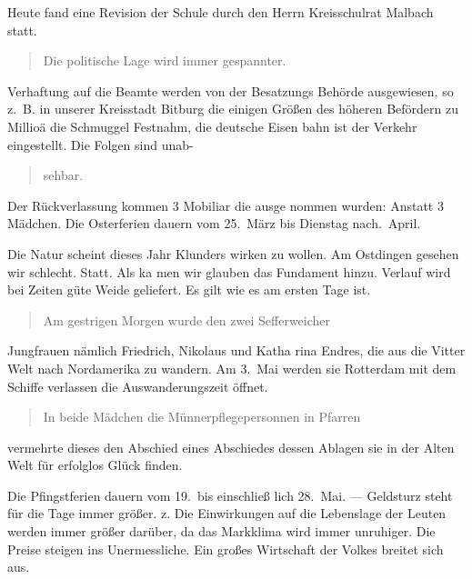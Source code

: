 

%
Heute fand eine Revision der Schule durch den Herrn\ob
Kreisschulrat Malbach statt.

\pend
\begin{verse}
Die politische Lage wird immer gespannter.
\end{verse}
\pstart
Verhaftung auf die Beamte werden von der Besatzungs\ohb
Behörde ausgewiesen, so z.\ B. in unserer Kreisstadt\ob
Bitburg die einigen Größen des höheren Befördern\ob
zu Millioä die Schmuggel Festnahm, die deutsche Eisen\ohb
bahn ist der Verkehr eingestellt. Die Folgen sind unab-

\pend
\begin{verse}
sehbar.
\end{verse}
\pstart

%
Der Rückverlassung kommen 3 Mobiliar die ausge\ohb
nommen wurden: Anstatt 3 Mädchen.\ob
Die Osterferien dauern vom 25.\ März bis Dienstag nach.\ April.

%
Die Natur scheint dieses Jahr Klunders wirken zu\ob
wollen. Am Ostdingen gesehen wir schlecht. Statt. Als ka\ohb
men wir glauben das Fundament hinzu. Verlauf wird\ob
bei Zeiten güte Weide geliefert. Es gilt wie es\ob
am ersten Tage ist.

\pend
\begin{verse}
Am gestrigen Morgen wurde den zwei Sefferweicher
\end{verse}
\pstart
Jungfrauen nämlich Friedrich, Nikolaus und Katha\ohb
rina Endres, die\unsicher{} aus die Vitter Welt nach\ob
Nordamerika zu wandern. Am 3.\ Mai werden sie\ob
Rotterdam mit dem Schiffe                    verlassen\ob
die Auswanderungszeit öffnet.

\pend
\begin{verse}
In beide Mädchen die Münner\unsicher pflegepersonnen in Pfarren
\end{verse}
\pstart
vermehrte dieses den Abschied eines Abschiedes dessen\ob
Ablagen sie in der Alten Welt für erfolglos Glück\ob
finden.

%
Die Pfingstferien dauern vom 19.\ bis einschließ\ohb
lich 28.\ Mai. — Geldsturz steht für die Tage immer\ob
größer. z. Die Einwirkungen auf die Lebenslage der\ob
Leuten werden immer größer darüber, da das Markklima\ob
wird immer unruhiger. Die Preise steigen ins\ob
Unermessliche. Ein großes Wirtschaft der Volkes\ob
breitet sich aus.
\pend
